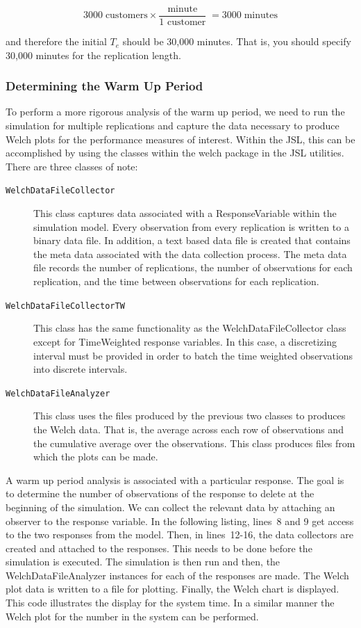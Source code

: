 \documentclass[
]{book}
\theoremstyle{definition}
\theoremstyle{definition}
\theoremstyle{definition}
\theoremstyle{definition}
\theoremstyle{remark}
\begin{document}
\[3000 \; \text{customers} \times \frac{\text{minute}}{\text{1 customer}} \; = 3000 \; \text{minutes}\]

and therefore the initial \(T_e\) should be 30,000 minutes. That is, you
should specify 30,000 minutes for the replication length.

\hypertarget{simoa:infhorizon:warmup}{%
\subsubsection{Determining the Warm Up Period}\label{simoa:infhorizon:warmup}}

To perform a more rigorous analysis of the warm up period, we need to
run the simulation for multiple replications and capture the data
necessary to produce Welch plots for the performance measures of
interest. Within the JSL, this can be accomplished by using the classes
within the welch package in the JSL utilities. There are three classes
of note:

\begin{description}
\item[\texttt{WelchDataFileCollector}]
This class captures data associated with a ResponseVariable within
the simulation model. Every observation from every replication is
written to a binary data file. In addition, a text based data file
is created that contains the meta data associated with the data
collection process. The meta data file records the number of
replications, the number of observations for each replication, and
the time between observations for each replication.
\item[\texttt{WelchDataFileCollectorTW}]
This class has the same functionality as the WelchDataFileCollector
class except for TimeWeighted response variables. In this case, a
discretizing interval must be provided in order to batch the time
weighted observations into discrete intervals.
\item[\texttt{WelchDataFileAnalyzer}]
This class uses the files produced by the previous two classes to
produces the Welch data. That is, the average across each row of
observations and the cumulative average over the observations. This
class produces files from which the plots can be made.
\end{description}

A warm up period analysis is associated with a particular response. The
goal is to determine the number of observations of the response to
delete at the beginning of the simulation. We can collect the relevant
data by attaching an observer to the response variable. In the following listing, lines~8 and 9 get access to the two responses from the model. Then, in lines~12-16, the data collectors are
created and attached to the responses. This needs to be done before the
simulation is executed. The simulation is then run and then, the WelchDataFileAnalyzer instances for each of the responses are made. The Welch plot data is written to a file for plotting. Finally, the Welch chart is displayed. This code illustrates the display for the system time. In a similar manner the Welch plot for the number in the system can be performed.
\end{document}
